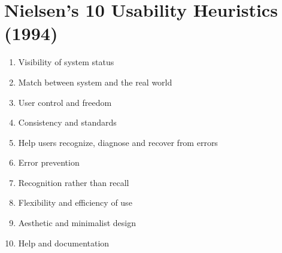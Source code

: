 \documentclass[a4paper,11pt,oneside]{article}
\begin{document}
\section{Nielsen’s 10 Usability Heuristics (1994)}
\begin{enumerate}
\item Visibility of system status
\item Match between system and the real world
\item User control and freedom
\item Consistency and standards
\item Help users recognize, diagnose and recover from errors
\item Error prevention
\item Recognition rather than recall
\item Flexibility and efficiency of use
\item Aesthetic and minimalist design
\item Help and documentation
\end{enumerate}
\end{document}
